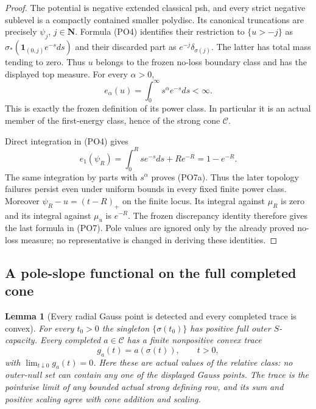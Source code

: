 \documentclass[11pt,a4paper]{article}
\numberwithin{equation}{section}
\newtheorem{lemma}[theorem]{Lemma}
\theoremstyle{definition}
\theoremstyle{remark}
\begin{document}
\begin{proof}
The potential is negative extended classical psh, and
every strict negative sublevel is a compactly contained
smaller polydisc.  Its canonical truncations are precisely
$\psi_j$, $j\in\mathbf N$.  Formula \textup{(PO4)}
identifies their restriction to $\{u>-j\}$ as
$\sigma_*(\mathbf1_{(0,j)}e^{-s}ds)$ and their discarded
part as $e^{-j}\delta_{\sigma(j)}$.  The latter has
total mass tending to zero.  Thus $u$ belongs to the
frozen no-loss boundary class and has the displayed
top measure.  For every $\alpha>0$,
\[
                   e_\alpha(u)=\int_0^\infty s^\alpha e^{-s}ds<\infty.
\]
This is exactly the frozen definition of its power class.
In particular it is an actual member of the first-energy
class, hence of the strong cone $\mathscr C$.

Direct integration in \textup{(PO4)} gives
\[
 e_1(\psi_R)=\int_0^R s e^{-s}ds+Re^{-R}=1-e^{-R}.
\]
The same integration by parts with $s^\alpha$ proves
\textup{(PO7a)}.  Thus the later topology failures persist
even under uniform bounds in every fixed finite power class.
Moreover $\psi_R-u=(t-R)_+$ on the finite locus.
Its integral against $\mu_R$ is zero and its integral
against $\mu_u$ is $e^{-R}$.  The frozen discrepancy
identity therefore gives the last formula in
\textup{(PO7)}.  Pole values are ignored only by the
already proved no-loss measure; no representative is
changed in deriving these identities.
\end{proof}

\subsection{A pole-slope functional on the full completed cone}

\begin{lemma}[Every radial Gauss point is detected and every completed trace is convex]
\label{lem:r12-radial-positive-capacity-traces}
For every $t_0>0$ the singleton $\{\sigma(t_0)\}$ has
positive full outer $S$-capacity.  Every completed
$a\in\mathscr C$ has a finite nonpositive convex trace
\[
                           g_a(t)=a(\sigma(t)),\qquad t>0,
 \tag{PO8}
\]
with $\lim_{t\downarrow0}g_a(t)=0$.
Here these are actual values of the relative class:
no outer-null set can contain any one of the displayed
Gauss points.  The trace is the pointwise limit of any
bounded actual strong defining row, and its sum and
positive scaling agree with cone addition and scaling.
\end{lemma}
\end{document}
